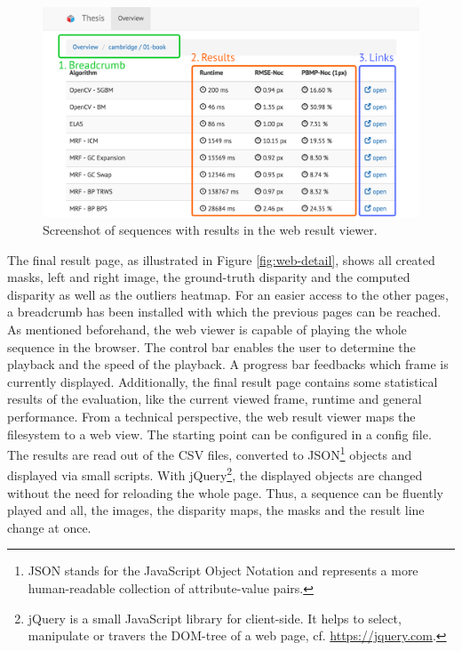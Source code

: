 \begin{figure}[h!]
  \centering
  \includegraphics[width=1.0\textwidth]{src/images/result-viewer-overview2.png}
  \caption[Screenshot of sequences in the web result viewer]{Screenshot of sequences with results in the web result viewer.}
  \label{fig:web-overview2}
\end{figure}

\noindent The final result page, as illustrated in Figure \ref{fig:web-detail}, shows all created masks, left and right image, the ground-truth disparity and the computed disparity as well as the outliers heatmap.
For an easier access to the other pages, a breadcrumb has been installed with which the previous pages can be reached.
As mentioned beforehand, the web viewer is capable of playing the whole sequence in the browser.
The control bar enables the user to determine the playback and the speed of the playback.
A progress bar feedbacks which frame is currently displayed.
Additionally, the final result page contains some statistical results of the evaluation, like the current viewed frame, runtime and general performance.
\newline\newline\noindent From a technical perspective, the web result viewer maps the filesystem to a web view.
The starting point can be configured in a config file.
The results are read out of the CSV files, converted to JSON\footnote{JSON stands for the JavaScript Object Notation and represents a more human-readable collection of attribute-value pairs.} objects and displayed via small scripts.
With jQuery\footnote{jQuery is a small JavaScript library for client-side. It helps to select, manipulate or travers the DOM-tree of a web page, cf. \url{https://jquery.com}.}, the displayed objects are changed without the need for reloading the whole page.
Thus, a sequence can be fluently played and all, the images, the disparity maps, the masks and the result line change at once.

